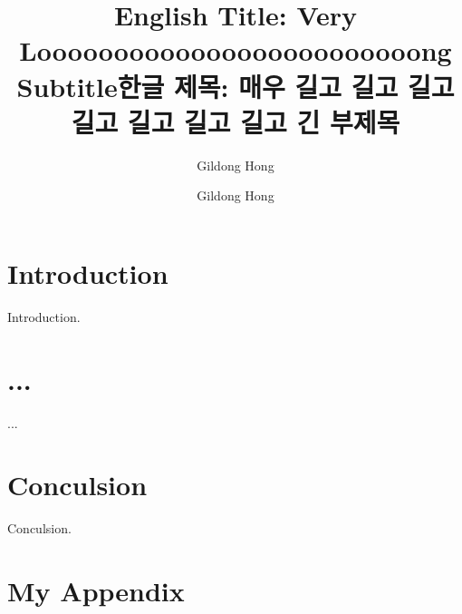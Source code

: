 \documentclass[oneside,phd]{snueethesis}
\title{English Title: Very\\ Looooooooooooooooooooooooong Subtitle}
\title*{한글 제목: 매우 길고 길고 길고\\ %
	길고 길고 길고 길고 긴 부제목}
\author{Gildong Hong}
\author*{Gildong Hong} %
\begin{document}
\makefrontcover
\makefrontcover
\makeapproval

\cleardoublepage
{}

\begin{abstract}
\noindent
\lipsum[1-3]
\end{abstract}

\tableofcontents
\listoffigures
\listoftables

\cleardoublepage
{}

\chapter{Introduction}
Introduction.

\chapter{...}
...

\chapter{Conculsion}
Conculsion.

\appendix

\chapter{My Appendix}
\lipsum[1-3]
\end{document}
